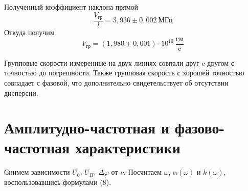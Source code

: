 \documentclass[a4paper,12pt]{article}
\theoremstyle{definition}
\begin{document}
	Полученный коэффициент наклона прямой
	$$\frac{V_\text{гр}}{l}=3,936\pm0,002\:\text{МГц} $$
	Откуда получим
	$$V_\text{гр}=(1,980\pm0,001)\cdot10^{10}\:\frac{\text{см}}{\text{c}}$$
	
	Групповые скорости измеренные на двух линиях совпали друг c другом с точностью до погрешности. Также групповая скорость с хорошей точностью совпадает с фазовой, что дополнительно свидетельствует об отсутствии дисперсии.
	

	\newpage


	\section{Амплитудно-частотная и фазово-частотная характеристики}

	Снимем зависимости $U_0$, $U_H$, $\Delta \varphi$ от $\nu$. 
	Посчитаем $\omega$, $\alpha(\omega)$ и $k(\omega)$, 
	воспользовавшись формулами (8).
\end{document}
